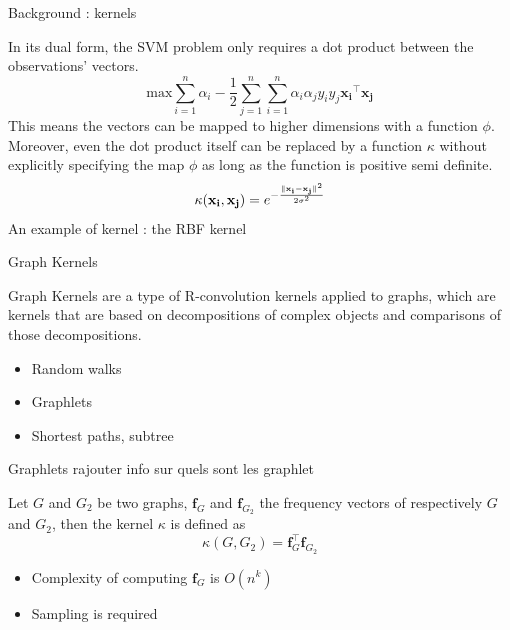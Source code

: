 \documentclass[compress]{beamer}
\DeclarePairedDelimiter{\norm}{\lVert}{\rVert}
\let\vec\mathbf
\begin{document}
\begin{frame}{Background : kernels}
	\begin{definition}
		In its dual form, the SVM problem only requires a dot product between the observations' vectors. 
		\begin{equation*}
		\text{max} \sum\limits_{i=1}^{n} \alpha_i - \frac{1}{2} \sum\limits_{j=1}^{n}\sum\limits_{i=1}^{n}\alpha_{i}\alpha_{j}y_{i}y_{j}\vec{x_{i}}^{\top}\vec{x_{j}}
		\end{equation*}
		This means the vectors can be mapped to higher dimensions with a function $\phi$. Moreover, even the dot product itself can be replaced by a function $\kappa$ without explicitly specifying the map $\phi$ as long as the function is positive semi definite.
		\begin{equation*}
		\kappa(\vec{x_{i}},\vec{x_{j}})={e}^{-\frac{\norm{\vec{x_{i}}-\vec{x_{j}}}^{2}}{2\sigma^{2}}}
		\end{equation*}
		\centering
		An example of kernel : the RBF kernel
	\end{definition}
\end{frame}
\begin{frame}{Graph Kernels}
    \begin{definition}
    	Graph Kernels are a type of R-convolution kernels\cite{haussler99convolution} applied to graphs, which are kernels that are based on decompositions of complex objects and comparisons of those decompositions.
    \end{definition}
	\begin{itemize}
		\item Random walks
		\item Graphlets
		\item Shortest paths, subtree
	\end{itemize}
\end{frame}
\begin{frame}{Graphlets}
rajouter info sur quels sont les graphlet
    \begin{definition}
   		Let $G$ and $G_2$ be two graphs, $\vec{f}_G$ and $\vec{f}_{G_2}$ the frequency vectors of respectively $G$ and $G_2$, then the kernel $\kappa$ is defined as
   		\begin{equation*}
   		\kappa(G,G_{2})=\vec{f}_{G}^{\top}\vec{f}_{G_2}
   		\end{equation*}
    \end{definition}
	\begin{itemize}
		\item Complexity of computing $\vec{f}_G$ is $O(n^k)$
		\item Sampling is required	
	\end{itemize}
\end{frame}
\end{document}

